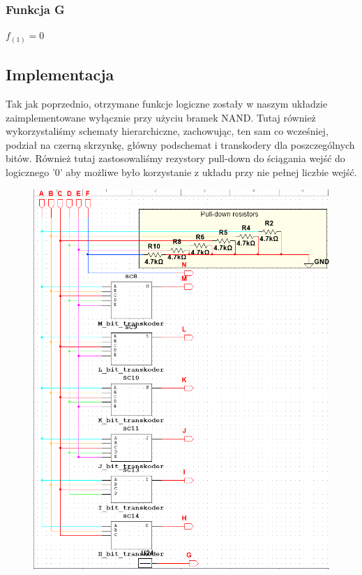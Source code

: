 \documentclass[a4paper]{article}
\begin{document}
\subsubsection{Funkcja G}
\begin{center}
  $f_{(1)} = 0 $
\end{center}

\subsection{Implementacja}
Tak jak poprzednio, otrzymane funkcje logiczne zostały w naszym układzie zaimplementowane wyłącznie przy użyciu bramek NAND.
  Tutaj również wykorzystaliśmy schematy hierarchiczne, zachowując, ten sam co wcześniej, podział na czerną skrzynkę, główny podschemat i transkodery dla poszczególnych bitów.
  Również tutaj zastosowaliśmy rezystory pull-down do ściągania wejść do logicznego '0' aby możliwe było korzystanie z układu 
  przy nie pełnej liczbie wejść.
\begin{figure}[H]
  \centering
  \includegraphics[width=\textwidth]{enkoder_bcd.png}
\end{figure}
\end{document}
